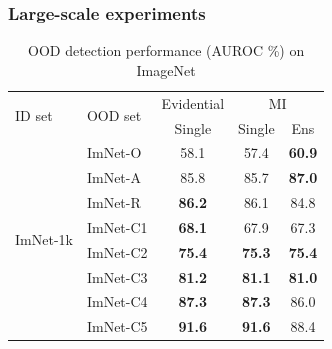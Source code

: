\documentclass[]{beamer}
\begin{document}
\begin{frame} \frametitle{Large-scale experiments}
\begin{table}[H]
    \begin{center}
    \caption{OOD detection performance (AUROC \%) on ImageNet}
    \begin{small}
        \begin{tabular}{ l l | c | c c }
            \toprule
            \multirow{2}{*}{ID set} & \multirow{2}{*}{OOD set} & \multicolumn{1}{c|}{Evidential} & \multicolumn{2}{c}{MI} \\
            & & Single & Single & Ens \\
            \midrule
            \multirow{8}{*}{ImNet-1k}
            & ImNet-O    & 58.1 %
                         & 57.4 & \bf{60.9} \\ %
            & ImNet-A    & 85.8 %
                         & 85.7 & \bf{87.0} \\ %
            & ImNet-R    & \bf{86.2} %
                         & 86.1 & 84.8 \\ %
            & ImNet-C1   & \bf{68.1} %
                         & 67.9 & 67.3 \\ %
            & ImNet-C2   & \bf{75.4} %
                         & \bf{75.3} & \bf{75.4} \\ %
            & ImNet-C3   & \bf{81.2} %
                         & \bf{81.1} & \bf{81.0} \\ %
            & ImNet-C4   & \bf{87.3} %
                         & \bf{87.3} & 86.0 \\ %
            & ImNet-C5   & \bf{91.6} %
                         & \bf{91.6} & 88.4 \\ %
            \bottomrule
        \end{tabular}
    \end{small}
    \end{center}
\end{table}
\end{frame}

\end{document}
